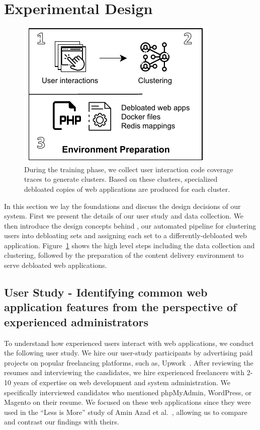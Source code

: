 \section{Experimental Design}

\begin{figure}[t]
    \centering
    \includegraphics[]{figures/dbltr/EnvironmentPreparation.pdf}
    \caption{During the training phase, we collect user interaction code coverage traces to generate clusters. Based on these clusters, specialized debloated copies of web applications are produced for each cluster.}
    \label{fig:environment_preparation}
\end{figure}

In this section we lay the foundations and discuss the design decisions of our system. 
First we present the details of our user study and data collection. 
We then introduce the design concepts behind \sys{}, our automated pipeline for clustering users into debloating sets and assigning each set to a differently-debloated web application.
Figure~\ref{fig:environment_preparation} shows the high level steps including the data collection and clustering, followed by the preparation of the content delivery environment to serve debloated web applications.

\subsection{User Study - Identifying common web application features from the perspective of experienced administrators}

To understand how experienced users interact with web applications, we conduct the following user study. 
We hire our user-study participants by advertising paid projects on popular freelancing platforms, such as, Upwork~\cite{upwork}. 
After reviewing the resumes and interviewing the candidates, we hire experienced freelancers with 2-10 years of expertise on web development and system administration. 
We specifically interviewed candidates who mentioned phpMyAdmin, WordPress, or Magento on their resume. We focused on these web applications since they were used in the ``Less is More'' study of Amin Azad et al.~\cite{lessismore}, allowing us to compare and contrast our findings with theirs. 

